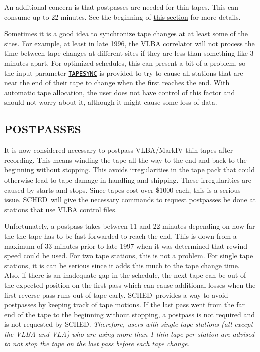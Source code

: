 \documentclass{report}
\newcommand{\sched}{{\sc SCHED}}
\newcommand{\schedb}{{\sc SCHED~}}
\begin{document}
An additional concern is that postpasses are needed for thin tapes.
This can consume up to 22 minutes.  See the beginning of
{\hyperref[SSEC:TAPEMANAGEMENT]{this section}} for more details.

Sometimes it is a good idea to synchronize tape changes at at least
some of the sites.  For example, at least in late 1996, the VLBA
correlator will not process the time between tape changes at different
sites if they are less than something like 3 minutes apart.  For
optimized schedules, this can present a bit of a problem, so the
input parameter 
{\hyperref[MP:TAPESYNC]{{\tt TAPESYNC}}} is provided to
try to cause all stations that are near the end of their tape to
change when the first reaches the end.  With automatic tape allocation,
the user does not have control of this factor and should not worry
about it, although it might cause some loss of data.

\subsection{\label{SSSEC:POSTPASS}POSTPASSES}

It is now considered necessary to postpass VLBA/MarkIV thin tapes
after recording.  This means winding the tape all the way to the end
and back to the beginning without stopping.  This avoids
irregularities in the tape pack that could otherwise lead to tape
damage in handling and shipping.  These irregularities are caused by
starts and stops.  Since tapes cost over \$1000 each, this is a
serious issue.  \schedb will give the necessary commands to request
postpasses be done at stations that use VLBA control files.

Unfortunately, a postpass takes between 11 and 22 minutes depending on
how far the the tape has to be fast-forwarded to reach the end.  This
is down from a maximum of 33 minutes prior to late 1997 when it was
determined that rewind speed could be used.  For two tape stations,
this is not a problem.  For single tape stations, it is can be serious
since it adds this much to the tape change time.  Also, if there is an
inadequate gap in the schedule, the next tape can be out of the
expected position on the first pass which can cause additional losses
when the first reverse pass runs out of tape early.  \schedb provides
a way to avoid postpasses by keeping track of tape motions.  If the
last pass went from the far end of the tape to the beginning without
stopping, a postpass is not required and is not requested by \sched.
{\em Therefore, users with single tape stations (all except the VLBA
and VLA) who are using more than 1 thin tape per station are advised
to not stop the tape on the last pass before each tape change.}
\end{document}
